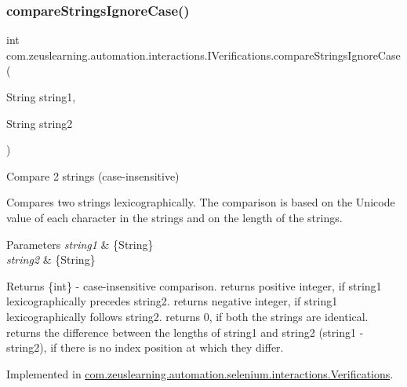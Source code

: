 \subsubsection{\texorpdfstring{compare\+Strings\+Ignore\+Case()}{compareStringsIgnoreCase()}}
{\footnotesize\ttfamily int com.\+zeuslearning.\+automation.\+interactions.\+I\+Verifications.\+compare\+Strings\+Ignore\+Case (\begin{DoxyParamCaption}\item[{String}]{string1,  }\item[{String}]{string2 }\end{DoxyParamCaption})}

Compare 2 strings (case-\/insensitive)

Compares two strings lexicographically. The comparison is based on the Unicode value of each character in the strings and on the length of the strings. 


\begin{DoxyParams}{Parameters}
{\em string1} & \{String\} \\
\hline
{\em string2} & \{String\} \\
\hline
\end{DoxyParams}
\begin{DoxyReturn}{Returns}
\{int\} -\/ case-\/insensitive comparison. returns positive integer, if {\ttfamily string1} lexicographically precedes {\ttfamily string2}. returns negative integer, if {\ttfamily string1} lexicographically follows {\ttfamily string2}. returns 0, if both the strings are identical. returns the difference between the lengths of {\ttfamily string1} and {\ttfamily string2} ({\ttfamily string1} -\/ {\ttfamily string2}), if there is no index position at which they differ. 
\end{DoxyReturn}


Implemented in \hyperlink{classcom_1_1zeuslearning_1_1automation_1_1selenium_1_1interactions_1_1Verifications_a23860edcf479a39582e0e0199bdac9c5}{com.\+zeuslearning.\+automation.\+selenium.\+interactions.\+Verifications}.

\hypertarget{interfacecom_1_1zeuslearning_1_1automation_1_1interactions_1_1IVerifications_aa130fde03f220efd0733c6481afa9b94}{}\label{interfacecom_1_1zeuslearning_1_1automation_1_1interactions_1_1IVerifications_aa130fde03f220efd0733c6481afa9b94} 
